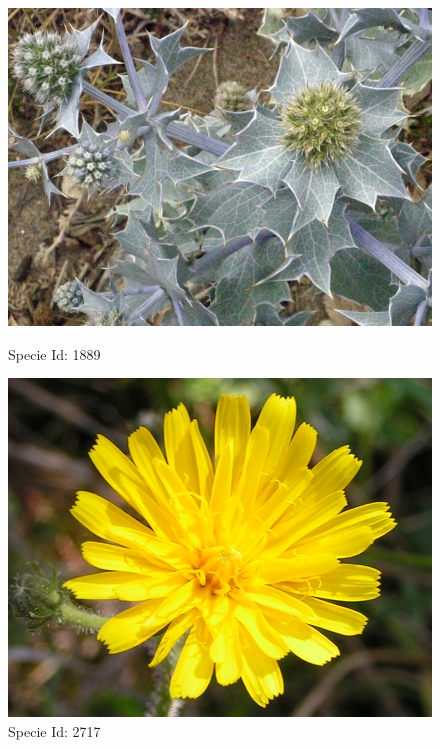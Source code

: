 \documentclass[xcolor=table]{beamer}
\begin{document}
\begin{frame}
\begin{figure}[htbp]
\begin{minipage}[c]{.45\linewidth}
\begin{center}
\includegraphics[scale=0.20]{4971.jpg}
\caption{Specie Id: 1889}
\label{fig:image6}
\end{center}
\end{minipage}
\hfill
\begin{minipage}[c]{.45\linewidth}
\begin{center}
\includegraphics[scale=0.08]{21604.jpg}
\caption{Specie Id: 2717}
\label{fig:image7}
\end{center}
\end{minipage}
\end{figure}

\end{frame}
\end{document}
